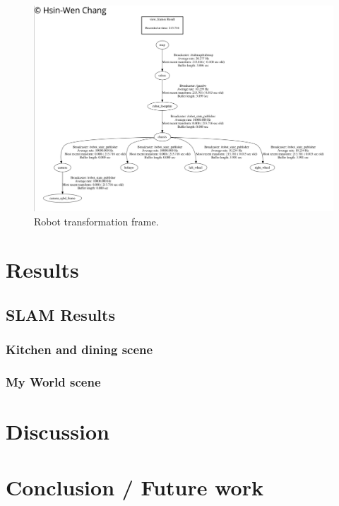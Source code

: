 \documentclass[10pt,journal,compsoc]{IEEEtran}
\begin{document}
\begin{figure}[thpb]
      \centering
      \includegraphics[width=\linewidth]{TransformFrames.png}
      \caption{Robot transformation frame.}
      \label{fig:robot1}
\end{figure}
\section{Results}

\subsection{SLAM Results}
\subsubsection{Kitchen and dining scene}

\subsubsection{My World scene}

\section{Discussion}


\section{Conclusion / Future work}
\end{document}
